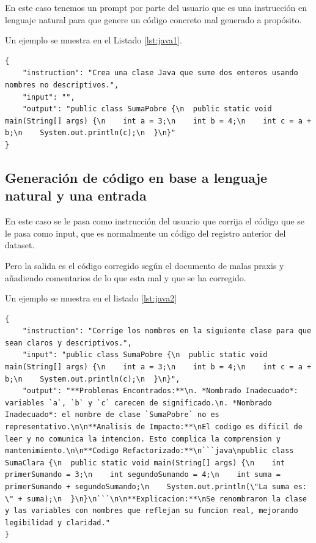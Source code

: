 En este caso tenemos un prompt por parte del usuario que es una instrucción en lenguaje natural para que genere un código concreto mal generado a propósito.

Un ejemplo se muestra en el Listado \ref{lst:java1}.

\begin{lstlisting}[style=json,caption={Ejemplo de entrada y salida para la generación de una clase Java},
captionpos=b,
label={lst:java1}]
{
    "instruction": "Crea una clase Java que sume dos enteros usando nombres no descriptivos.",
    "input": "",
    "output": "public class SumaPobre {\n  public static void main(String[] args) {\n    int a = 3;\n    int b = 4;\n    int c = a + b;\n    System.out.println(c);\n  }\n}"
}
\end{lstlisting}

\subsection{Generación de código en base a lenguaje natural y una entrada}

En este caso se le pasa como instrucción del usuario que corrija el código que se le pasa como input, que es normalmente un código del registro anterior del dataset.

Pero la salida es el código corregido según el documento de malas praxis y añadiendo comentarios de lo que esta mal y que se ha corregido.

Un ejemplo se muestra en el listado \ref{lst:java2}

\newpage
\begin{lstlisting}[style=json,caption={Ejemplo de entrada en lenguaje natural con código Java y una salida para la generación de una clase Java},
captionpos=b,
label={lst:java2}]
{
    "instruction": "Corrige los nombres en la siguiente clase para que sean claros y descriptivos.",
    "input": "public class SumaPobre {\n  public static void main(String[] args) {\n    int a = 3;\n    int b = 4;\n    int c = a + b;\n    System.out.println(c);\n  }\n}",
    "output": "**Problemas Encontrados:**\n. *Nombrado Inadecuado*: variables `a`, `b` y `c` carecen de significado.\n. *Nombrado Inadecuado*: el nombre de clase `SumaPobre` no es representativo.\n\n**Analisis de Impacto:**\nEl codigo es dificil de leer y no comunica la intencion. Esto complica la comprension y mantenimiento.\n\n**Codigo Refactorizado:**\n```java\npublic class SumaClara {\n  public static void main(String[] args) {\n    int primerSumando = 3;\n    int segundoSumando = 4;\n    int suma = primerSumando + segundoSumando;\n    System.out.println(\"La suma es: \" + suma);\n  }\n}\n```\n\n**Explicacion:**\nSe renombraron la clase y las variables con nombres que reflejan su funcion real, mejorando legibilidad y claridad."
}
\end{lstlisting}

